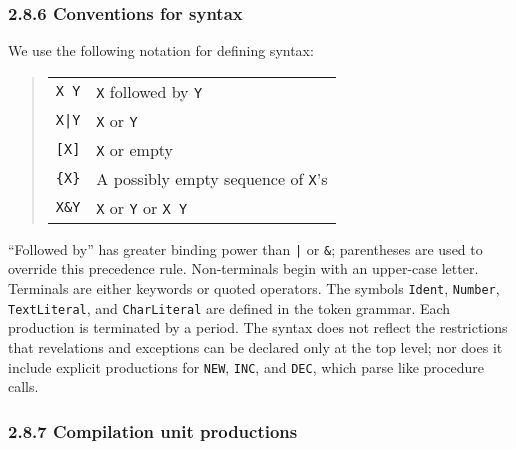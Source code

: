 \documentclass[10pt]{article}
\begin{document}
\subsubsection*{2.8.6 Conventions for syntax}

We use the following notation for defining syntax:
\begin{quote}
  \begin{tabular}{cl}
    \verb|X Y| & \verb|X| followed by \verb|Y| \\
    \verb+X|Y+ & \verb|X| or \verb|Y| \\
    \verb|[X]| & \verb|X| or empty \\
    \verb|{X}| & A possibly empty sequence of \verb|X|'s \\
    \verb|X&Y| & \verb|X| or \verb|Y| or \verb|X Y| \\
  \end{tabular}
\end{quote}
``Followed by'' has greater binding power than \verb+|+ or \verb|&|;
parentheses are used to override this precedence rule.  Non-terminals begin
with an upper-case letter.  Terminals are either keywords or quoted operators.
The symbols \verb|Ident|, \verb|Number|, \verb|TextLiteral|, and
\verb|CharLiteral| are defined in the token grammar.  Each production is
terminated by a period.  The syntax does not reflect the restrictions that
revelations and exceptions can be declared only at the top level; nor does it
include explicit productions for \verb|NEW|, \verb|INC|, and \verb|DEC|, which
parse like procedure calls.

\subsubsection*{2.8.7 Compilation unit productions}
\end{document}
